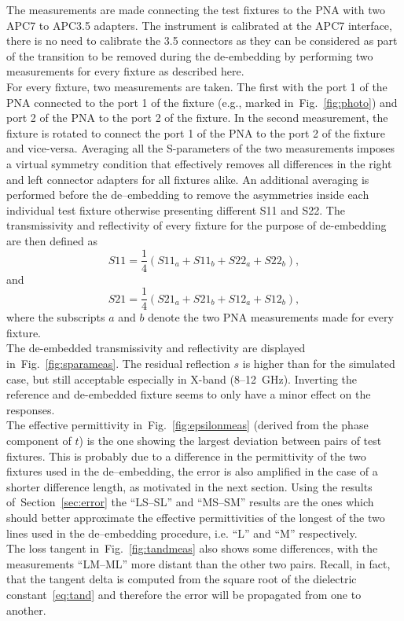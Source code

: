 \documentclass[11pt,a4paper]{article}
\newcommand{\sref}[1]{Section~\ref{#1}}
\newcommand{\fig}[1]{Fig.~\ref{#1}}
\newcommand{\laser}[1]{``#1''}
\begin{document}
    The measurements are made connecting the test fixtures to the PNA with two APC7 to APC3.5 adapters.
    The instrument is calibrated at the APC7 interface, there is no need to calibrate the 3.5 connectors as they can be
    considered as part of the transition to be removed during the de-embedding by performing two measurements for every
    fixture as described here.\\
    For every fixture, two measurements are taken.
    The first with the port 1 of the PNA connected to the port 1 of the fixture (e.g., marked in~\fig{fig:photo}) and
    port 2 of the PNA to the port 2 of the fixture.
    In the second measurement, the fixture is rotated to connect the port 1 of the PNA to the port 2 of the fixture and
    vice-versa.
    Averaging all the S-parameters of the two measurements imposes a virtual symmetry condition that effectively removes
    all differences in the right and left connector adapters for all fixtures alike.
    An additional averaging is performed before the de--embedding to remove the asymmetries inside each individual test
    fixture otherwise presenting different S11 and S22.
    The transmissivity and reflectivity of every fixture for the purpose of de-embedding are then defined as
    \begin{equation}
        S11 = \dfrac{1}{4}(S11_a + S11_b + S22_a + S22_b),
        \label{eq:saverage}
    \end{equation}
    and
       \begin{equation}
        S21 = \dfrac{1}{4}(S21_a + S21_b + S12_a + S12_b),
        \label{eq:taverage}
    \end{equation}
    where the subscripts $a$ and $b$ denote the two PNA measurements made for every fixture.\\
    The de-embedded transmissivity and reflectivity are displayed in~\fig{fig:sparameas}.
    The residual reflection $s$ is higher than for the simulated case, but still acceptable especially in X-band (8--12~GHz).
    Inverting the reference and de-embedded fixture seems to only have a minor effect on the responses.\\
    The effective permittivity in~\fig{fig:epsilonmeas} (derived from the phase component of $t$) is the one showing
    the largest deviation between pairs of test fixtures.
    This is probably due to a difference in the permittivity of the two fixtures used in the de--embedding, the error
    is also amplified in the case of a shorter difference length, as motivated in the next section.
    Using the results of~\sref{sec:error} the \laser{LS--SL} and \laser{MS--SM} results are the ones which should better
    approximate the effective permittivities of the longest of the two lines used in the de--embedding procedure, i.e.
    \laser{L} and \laser{M} respectively.\\
    The loss tangent in~\fig{fig:tandmeas} also shows some differences, with the measurements \laser{LM--ML} more distant
    than the other two pairs.
    Recall, in fact, that the tangent delta is computed from the square root of the dielectric constant~\eqref{eq:tand}
    and therefore the error will be propagated from one to another.
\end{document}
